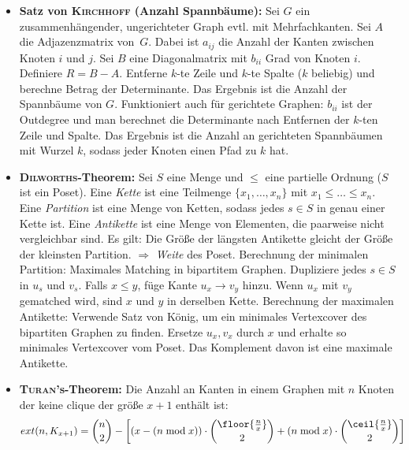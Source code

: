 \begin{itemize}
	\item \textbf{Satz von \textsc{Kirchhoff} (Anzahl Spannbäume):}
	Sei $G$ ein zusammenhängender, ungerichteter Graph evtl. mit Mehrfachkanten.
	Sei $A$ die Adjazenzmatrix von~$G$.
	Dabei ist $a_{ij}$ die Anzahl der Kanten zwischen Knoten $i$ und $j$.
	Sei $B$ eine Diagonalmatrix mit $b_{ii}$ Grad von Knoten $i$.
	Definiere $R = B - A$.
	Entferne $k$-te Zeile und $k$-te Spalte ($k$ beliebig) und berechne Betrag der Determinante.
	Das Ergebnis ist die Anzahl der Spannbäume von $G$.
	\newline
	Funktioniert auch für gerichtete Graphen: $b_{ii}$ ist der Outdegree und man
	berechnet die Determinante nach Entfernen der $k$-ten Zeile und Spalte.
	Das Ergebnis ist die Anzahl an gerichteten Spannbäumen mit Wurzel $k$,
	sodass jeder Knoten einen Pfad zu $k$ hat.

	\item \textbf{\textsc{Dilworths}-Theorem:}
	Sei $S$ eine Menge und $\leq$ eine partielle Ordnung ($S$ ist ein Poset).
	Eine \emph{Kette} ist eine Teilmenge $\{x_1,\ldots,x_n\}$ mit $x_1 \leq \ldots \leq x_n$.
	Eine \emph{Partition} ist eine Menge von Ketten, sodass jedes $s \in S$ in genau einer Kette ist.
	Eine \emph{Antikette} ist eine Menge von Elementen, die paarweise nicht vergleichbar sind.
	\newline
	Es gilt: Die Größe der längsten Antikette gleicht der Größe der kleinsten Partition.
	$\Rightarrow$ \emph{Weite} des Poset.
	\newline
	Berechnung der minimalen Partition: Maximales Matching in bipartitem Graphen.
	Dupliziere jedes $s \in S$ in $u_s$ und $v_s$.
	Falls $x \leq y$, füge Kante $u_x \to v_y$ hinzu.
	Wenn $u_x$ mit $v_y$ gematched wird, sind $x$ und $y$ in derselben Kette.
	\newline
	Berechnung der maximalen Antikette: Verwende Satz von König, um ein
	minimales Vertexcover des bipartiten Graphen zu finden.
	Ersetze $u_x, v_x$ durch $x$ und erhalte so minimales Vertexcover vom Poset.
	Das Komplement davon ist eine maximale Antikette.
	
	\item \textbf{\textsc{Turan}'s-Theorem:}
	Die Anzahl an Kanten in einem Graphen mit $n$ Knoten der keine clique der größe $x+1$ enthält ist:
	\begin{align*}
	ext(n, K_{x+1}) &= \binom{n}{2} - \left[\left(x - (n \bmod x)\right) \cdot \binom{\floor{\frac{n}{x}}}{2} + \left(n\bmod x\right)  \cdot \binom{\ceil{\frac{n}{x}}}{2}\right]
	\end{align*}
	

\end{itemize}
